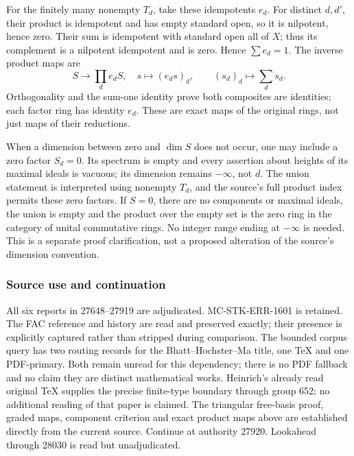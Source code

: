 For the finitely many nonempty \(T_d\), take these idempotents \(e_d\). For distinct \(d,d'\), their product is idempotent and has empty standard open, so it is nilpotent, hence zero. Their sum is idempotent with standard open all of \(X\); thus its complement is a nilpotent idempotent and is zero. Hence \(\sum e_d=1\). The inverse product maps are \[
 S\longrightarrow\prod_d e_dS,\quad s\longmapsto(e_ds)_d,
 \qquad (s_d)_d\longmapsto\sum_d s_d.
\] Orthogonality and the sum-one identity prove both composites are identities; each factor ring has identity \(e_d\). These are exact maps of the original rings, not just maps of their reductions.

When a dimension between zero and \(\dim S\) does not occur, one may include a zero factor \(S_d=0\). Its spectrum is empty and every assertion about heights of its maximal ideals is vacuous; its dimension remains \(-\infty\), not \(d\). The union statement is interpreted using nonempty \(T_d\), and the source's full product index permits these zero factors. If \(S=0\), there are no components or maximal ideals, the union is empty and the product over the empty set is the zero ring in the category of unital commutative rings. No integer range ending at \(-\infty\) is needed. This is a separate proof clarification, not a proposed alteration of the source's dimension convention.

\subsubsection{Source use and continuation}\label{algebra-proof-025-source-use-and-continuation}

All six reports in 27648--27919 are adjudicated. MC-STK-ERR-1601 is retained. The FAC reference and history are read and preserved exactly; their presence is explicitly captured rather than stripped during comparison. The bounded corpus query has two routing records for the Bhatt--Hochster--Ma title, one TeX and one PDF-primary. Both remain unread for this dependency; there is no PDF fallback and no claim they are distinct mathematical works. Heinrich's already read original TeX supplies the precise finite-type boundary through group 652; no additional reading of that paper is claimed. The triangular free-basis proof, graded maps, component criterion and exact product maps above are established directly from the current source. Continue at authority 27920. Lookahead through 28030 is read but unadjudicated.
